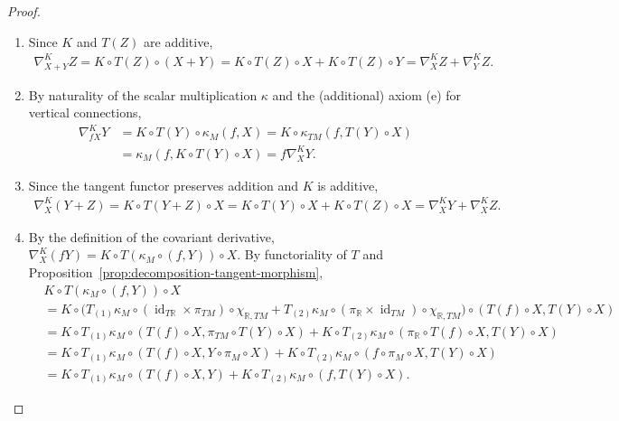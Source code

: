 \documentclass{amsart}
\newcommand{\R}{\mathbb{R}}
\DeclareMathOperator{\id}{id}
\theoremstyle{definition}
\begin{document}
\begin{proof}
  \begin{enumerate}
    \item Since $K$ and $T(Z)$ are additive,
    \begin{align*}
      \nabla^K_{X+Y} Z
        = K \circ T(Z) \circ (X + Y)
        = K \circ T(Z) \circ X + K \circ T(Z) \circ Y
        = \nabla^K_X Z + \nabla^K_Y Z.
    \end{align*}
    \item By naturality of the scalar multiplication $\kappa$ and
      the (additional) axiom (e) for vertical connections,
    \begin{align*}
      \nabla^K_{fX}Y
        &= K \circ T(Y) \circ \kappa_M(f, X)
         = K \circ \kappa_{TM}(f, T(Y)\circ X) \\
        &= \kappa_M(f, K \circ T(Y) \circ X)
         = f\nabla^K_X Y.
    \end{align*}
    \item Since the tangent functor preserves addition and $K$ is additive,
    \begin{align*}
      \nabla^K_X (Y + Z)
        = K \circ T(Y+Z) \circ X
        = K \circ T(Y) \circ X + K \circ T(Z) \circ X
        = \nabla^K_X Y + \nabla^K_X Z.
    \end{align*}
    \item By the definition of the covariant derivative,
      $\nabla^K_X (fY) = K \circ T(\kappa_M \circ (f, Y)) \circ X$.
      By functoriality of $T$ and
      Proposition~\ref{prop:decomposition-tangent-morphism},
    \begin{align*}
     & K \circ T(\kappa_M \circ (f, Y)) \circ X \\
        &= K \circ \bigl(T_{(1)} \kappa_M \circ (\id_{T\R} \times \pi_{TM})
            \circ \chi_{\R,TM}
           + T_{(2)} \kappa_M \circ (\pi_{\R} \times \id_{TM})
            \circ \chi_{\R,TM}\bigr)
          \circ (T(f)\circ X, T(Y) \circ X) \\
        &= K \circ T_{(1)} \kappa_M \circ (T(f)\circ X, \pi_{TM} \circ T(Y) \circ X)
           + K \circ T_{(2)} \kappa_M \circ (\pi_{\R} \circ T(f)\circ X, T(Y) \circ X) \\
        &= K \circ T_{(1)} \kappa_M \circ (T(f)\circ X, Y \circ \pi_M \circ X)
           + K \circ T_{(2)} \kappa_M \circ (f \circ \pi_M \circ X, T(Y) \circ X) \\
        &= K \circ T_{(1)} \kappa_M \circ (T(f)\circ X, Y)
           + K \circ T_{(2)} \kappa_M \circ (f, T(Y) \circ X).

\end{align*}
\end{enumerate}
\end{proof}
\end{document}
